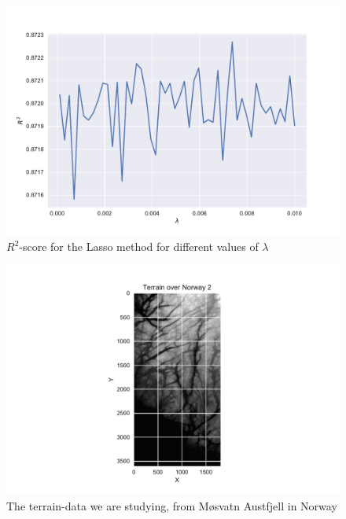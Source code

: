 \documentclass[a4paper,10pt,english]{article}
\begin{document}
\begin{figure}[h!]
	\centering 
	\includegraphics[scale=0.6]{../results/part_e_reg_R2.pdf}
	\caption{$R^2$-score for the Lasso method for different values of $\lambda$}
	\label{part_e_R2}
\end{figure}


\begin{figure}[h!]
	\centering 
	\includegraphics[scale=0.9]{../results/part_g_input.pdf}
	\caption{The terrain-data we are studying, from Møsvatn Austfjell in Norway}
	\label{part_g_input}
\end{figure}
\end{document}
